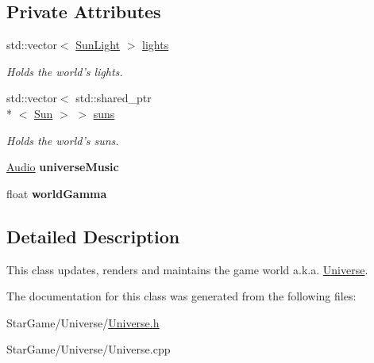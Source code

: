 \subsection*{Private Attributes}
\begin{DoxyCompactItemize}
\item 
\hypertarget{class_universe_a48a408b8a01b50f05df5fc20ae2e99a8}{std\-::vector$<$ \hyperlink{class_sun_light}{Sun\-Light} $>$ \hyperlink{class_universe_a48a408b8a01b50f05df5fc20ae2e99a8}{lights}}\label{class_universe_a48a408b8a01b50f05df5fc20ae2e99a8}

\begin{DoxyCompactList}\small\item\em Holds the world's lights. \end{DoxyCompactList}\item 
\hypertarget{class_universe_a958fd8a9e69878b1ae4526ab692ada9e}{std\-::vector$<$ std\-::shared\-\_\-ptr\\*
$<$ \hyperlink{class_sun}{Sun} $>$ $>$ \hyperlink{class_universe_a958fd8a9e69878b1ae4526ab692ada9e}{suns}}\label{class_universe_a958fd8a9e69878b1ae4526ab692ada9e}

\begin{DoxyCompactList}\small\item\em Holds the world's suns. \end{DoxyCompactList}\item 
\hypertarget{class_universe_a46f9c6d342e35cb41c8c569ccb365c5f}{\hyperlink{class_audio}{Audio} {\bfseries universe\-Music}}\label{class_universe_a46f9c6d342e35cb41c8c569ccb365c5f}

\item 
\hypertarget{class_universe_afaf8026ff2c6560ea3ae7ced43765919}{float {\bfseries world\-Gamma}}\label{class_universe_afaf8026ff2c6560ea3ae7ced43765919}

\end{DoxyCompactItemize}


\subsection{Detailed Description}
This class updates, renders and maintains the game world a.\-k.\-a. \hyperlink{class_universe}{Universe}. 

The documentation for this class was generated from the following files\-:\begin{DoxyCompactItemize}
\item 
Star\-Game/\-Universe/\hyperlink{_universe_8h}{Universe.\-h}\item 
Star\-Game/\-Universe/Universe.\-cpp\end{DoxyCompactItemize}
